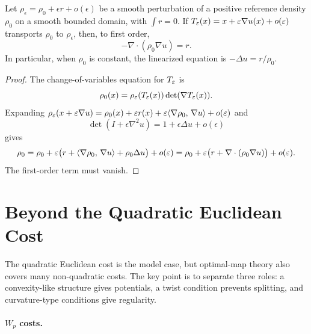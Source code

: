 \begin{prop}\label{prop-linearized-monge-ampere}
	Let $\rho_\epsilon=\rho_0+\epsilon r+o(\epsilon)$ be a smooth perturbation of a positive reference density $\rho_0$ on a smooth bounded domain, with $\int r=0$. If $T_\varepsilon(x)=x+\varepsilon\nabla u(x)+o(\varepsilon)$ transports $\rho_0$ to $\rho_\epsilon$, then, to first order,
	\[
		-\nabla\cdot(\rho_0\nabla u)=r.
	\]
	In particular, when $\rho_0$ is constant, the linearized equation is $-\Delta u=r/\rho_0$.
\end{prop}
\begin{proof}
	The change-of-variables equation for $T_\varepsilon$ is
	\[
		\rho_0(x)
		=
		\rho_\varepsilon(T_\varepsilon(x))\det(\nabla T_\varepsilon(x)).
	\]
	Expanding $\rho_\varepsilon(x+\varepsilon\nabla u)=\rho_0(x)+\varepsilon r(x)+\varepsilon\langle \nabla\rho_0,\,\nabla u\rangle+o(\varepsilon)$ and
	\[
		\det(I+\epsilon\nabla^2u)=1+\epsilon\Delta u+o(\epsilon)
	\]
	gives
	\[
		\rho_0
		=
		\rho_0+
		\varepsilon\bigl(r+\langle \nabla\rho_0,\,\nabla u\rangle+\rho_0\Delta u\bigr)+o(\varepsilon)
		=
		\rho_0+
		\varepsilon\bigl(r+\nabla\cdot(\rho_0\nabla u)\bigr)+o(\varepsilon).
	\]
	The first-order term must vanish.
\end{proof}


\section{Beyond the Quadratic Euclidean Cost}
\label{sec-beyond-quadratic-euclidean-cost}

The quadratic Euclidean cost is the model case, but optimal-map theory also covers many non-quadratic costs. The key point is to separate three roles: a convexity-like structure gives potentials, a twist condition prevents splitting, and curvature-type conditions give regularity.

\paragraph{\texorpdfstring{$W_p$ costs.}{Wp costs}}

